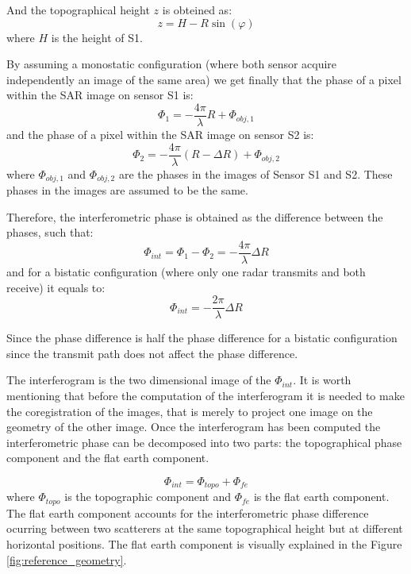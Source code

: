 And the topographical height $z$ is obteined as: 
\begin{equation}
    z = H - R\sin(\varphi)
\end{equation}
where $H$ is the height of S1.

By assuming a monostatic configuration (where both sensor acquire independently an image of the same area) we get 
finally that the phase of a pixel within the SAR image on sensor S1 is:
\begin{equation}
    \Phi_1 = -\frac{4\pi}{\lambda} R + \Phi_{obj,1}
\end{equation}
and the phase of a pixel within the SAR image on sensor S2 is:
\begin{equation}
    \Phi_2 = -\frac{4\pi}{\lambda} (R - \Delta R) + \Phi_{obj,2}
\end{equation}
where $\Phi_{obj,1}$ and $\Phi_{obj,2}$ are the phases in the images of Sensor S1 and S2. These phases in the images are assumed to be the same.

Therefore, the interferometric phase is obtained as the difference between the phases, such that:
\begin{equation}
    \Phi_{int} = \Phi_{1} - \Phi_{2} = -\frac{4 \pi}{\lambda} \Delta R
\end{equation}
and for a bistatic configuration (where only one radar transmits and both receive) it equals to:
\begin{equation}
    \Phi_{int} = -\frac{2 \pi}{\lambda} \Delta R
\end{equation}


Since the phase difference is half the phase difference for a bistatic configuration since the transmit path does not affect the phase difference.

The interferogram is the two dimensional image of the $\Phi_{int}$. It is worth mentioning that before the computation of the interferogram it is needed to make the coregistration of the images, that is merely to project one image on the geometry of the other image.
Once the interferogram has been computed the interferometric phase can be decomposed into two parts: the topographical phase component and the flat earth component.

\begin{equation}
    \Phi_{int} = \Phi_{topo} + \Phi_{fe}
\end{equation}
where $\Phi_{topo}$ is the topographic component and $\Phi_{fe}$ is the flat earth component.
The flat earth component accounts for the interferometric phase difference ocurring between two scatterers at the same topographical height but at different horizontal positions. The flat earth component is visually explained in the Figure \ref{fig:reference_geometry}.

